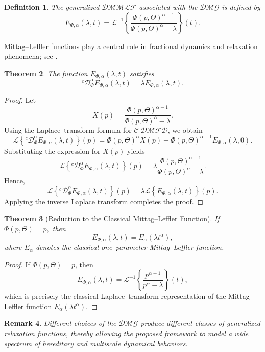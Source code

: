 \documentclass[11pt]{article}
\numberwithin{equation}{section}
\newtheorem{definition}{Definition}[section]
\newtheorem{theorem}[definition]{Theorem}
\newtheorem{remark}[definition]{Remark}
\begin{document}
\begin{definition}
The generalized $\mathcal{DMMLF}$
associated with the $\mathcal{DMG}$ is defined by
\[
E_{\Phi,\alpha}(\lambda,t)
=
\mathcal L^{-1}
\left\{
\frac{
\Phi(p,\Theta)^{\alpha-1}
}{
\Phi(p,\Theta)^\alpha-\lambda
}
\right\}(t).
\]
\end{definition}
\noindent Mittag--Leffler functions play a central role in fractional dynamics and relaxation phenomena; see \cite{Haubold2011,Gorenflo2014}.


\begin{theorem}
The function $E_{\Phi,\alpha}(\lambda,t)$ satisfies
\[
{}^c\mathcal D_\Phi^\alpha
E_{\Phi,\alpha}(\lambda,t)
=
\lambda
E_{\Phi,\alpha}(\lambda,t).
\]
\end{theorem}

\begin{proof}
Let
\[
X(p)
=
\frac{
\Phi(p,\Theta)^{\alpha-1}
}{
\Phi(p,\Theta)^\alpha-\lambda
}.
\]
Using the Laplace--transform formula for $\mathcal{C\;DMFD}$, we obtain
\[
\mathcal L
\left\{
{}^c\mathcal D_\Phi^\alpha
E_{\Phi,\alpha}(\lambda,t)
\right\}(p)
=
\Phi(p,\Theta)^\alpha X(p)
-
\Phi(p,\Theta)^{\alpha-1}E_{\Phi,\alpha}(\lambda,0).
\]
Substituting the expression for $X(p)$ yields
\[
\mathcal L
\left\{
{}^c\mathcal D_\Phi^\alpha
E_{\Phi,\alpha}(\lambda,t)
\right\}(p)
=
\lambda
\frac{
\Phi(p,\Theta)^{\alpha-1}
}{
\Phi(p,\Theta)^\alpha-\lambda
}.
\]
Hence,
\[
\mathcal L
\left\{
{}^c\mathcal D_\Phi^\alpha
E_{\Phi,\alpha}(\lambda,t)
\right\}(p)
=
\lambda
\mathcal L
\left\{
E_{\Phi,\alpha}(\lambda,t)
\right\}(p).
\]
Applying the inverse Laplace transform completes the proof.
\end{proof}


\begin{theorem}[Reduction to the Classical Mittag--Leffler Function]
If
\(
\Phi(p,\Theta)=p,
\)
then
\[
E_{\Phi,\alpha}(\lambda,t)
=
E_\alpha(\lambda t^\alpha),
\]
where $E_\alpha$ denotes the classical one--parameter Mittag--Leffler function.
\end{theorem}

\begin{proof}
If $\Phi(p,\Theta)=p$, then
\[
E_{\Phi,\alpha}(\lambda,t)
=
\mathcal L^{-1}
\left\{
\frac{
p^{\alpha-1}
}{
p^\alpha-\lambda
}
\right\}(t),
\]
which is precisely the classical Laplace--transform representation of the Mittag--Leffler function
\(
E_\alpha(\lambda t^\alpha).
\)
\end{proof}

\begin{remark}
Different choices of the $\mathcal{DMG}$  produce different classes of generalized relaxation functions, thereby allowing the proposed framework to model a wide spectrum of hereditary and multiscale dynamical behaviors.
\end{remark}
\end{document}

